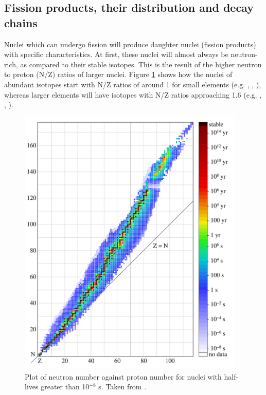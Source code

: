 \subsection{Fission products, their distribution and decay chains} \label{fissionyieldsection}

Nuclei which can undergo fission will produce daughter nuclei (fission products) with specific characteristics. At first, these nuclei will almost always be neutron-rich, as compared to their stable isotopes. This is the result of the higher neutron to proton (N/Z) ratios of larger nuclei. Figure \ref{figure:NZcurve} shows how the nuclei of abundant isotopes start with N/Z ratios of around 1 for small elements (e.g. , , ), whereas larger elements will have isotopes with N/Z ratios approaching 1.6 (e.g. , , ).

\begin{figure}[ht]
\centering
\includegraphics[height=13cm]{images/Isotopes_and_half-life.png}
\caption[Plot of neutron number against proton number for nuclei with half-lives greater than 10${^{-8}}$ s.]{Plot of neutron number against proton number for nuclei with half-lives greater than 10${^{-8}}$ s. Taken from \cite{BenRG}.}
\label{figure:NZcurve}
\end{figure} 

